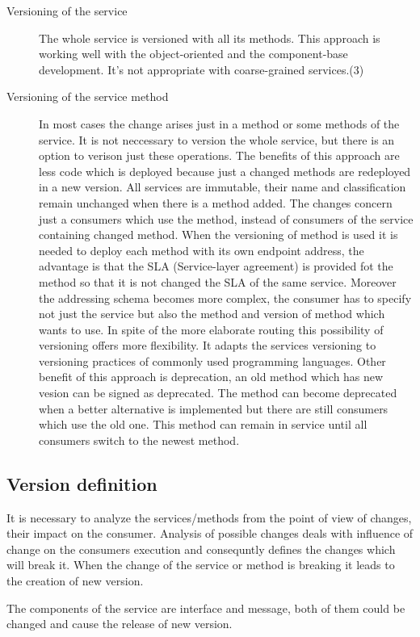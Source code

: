 \begin{description}
  \item[Versioning of the service] 
  The whole service is versioned with all its methods. This approach is working well with the object-oriented and the component-base development. It's not appropriate with coarse-grained services.(3)
  \item[Versioning of the service method] 
  In most cases the change arises just in a method or some methods of the service. It is not neccessary to version the whole service, but there is an option to verison just these operations.
  The benefits of this approach are less code which is deployed because just a changed methods are redeployed in a new version. All services are immutable, their name and classification remain unchanged when there is a method added. The changes concern just a consumers which use the method, instead of consumers of the service containing changed method. 
  When the versioning of method is used it is needed to deploy each method with its own endpoint address, the advantage is that the SLA (Service-layer agreement) is provided fot the method so that it is not changed the SLA of the same service.
  Moreover the addressing schema becomes more complex, the consumer has to specify not just the service but also the method and version of method which wants to use.
In spite of the more elaborate routing this possibility of versioning offers more flexibility. It adapts the services versioning to versioning practices of commonly used programming languages. 
Other benefit of this approach is deprecation, an old method which has new vesion can be signed as deprecated. The method can become deprecated when a better alternative is implemented but there are still consumers which use the old one. This method can remain in service until all consumers switch to the newest method.
\end{description}

\subsection{Version definition}
It is necessary to analyze the services/methods from the point of view of changes, their impact on the consumer. Analysis of possible changes deals with influence of change on the consumers execution and consequntly defines the changes which will break it. When the change of the service or method is breaking it leads to the creation of new version.

The components of the service are interface and message, both of them could be changed and cause the release of new version.

